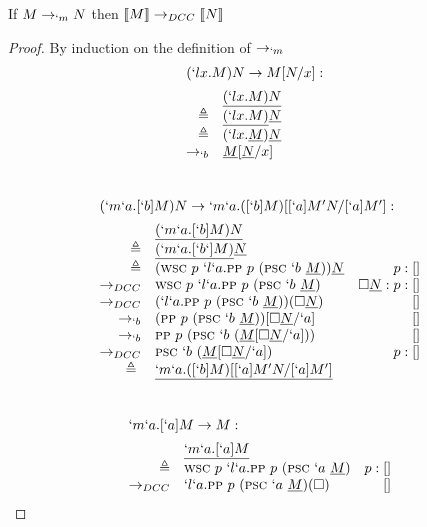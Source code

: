 \begin{theorem}
If $M \rightarrow_{`m} N$ then $\llbracket M \rrbracket \rightarrow_{DCC} \llbracket N \rrbracket$
\end{theorem}

\begin{proof}{By induction on the definition of $\rightarrow_{`m}$}
\[
\begin{array}{rlrl}
  \prooflabel{(`lx.M)N \to M[N/x]:} \\
               & \tr{(`lx.M)N} \\
    \triangleq & \tr{(`lx.M)} \tr{N} \\
    \triangleq & (`lx.\tr{M}) \tr{N} \\
    \tob\   & \tr{M}[\tr{N}/x] \\
\end{array} 
\]
\\
\[
\begin{array}{rlrl}
  \prooflabel{(`m`a.[`b]M)N \to `m`a.([`b]M)[[`a]M^\prime N/[`a]M^\prime]:} \\
             & \tr{(`m`a.[`b]M)N} \\
  \triangleq & \tr{(`m`a.[`b`]M)} \tr{N} \\
  \triangleq & (\wsc\ p\ `l`a. \pp\ p\ (\psc\ `b\ \tr{M})) \tr{N} & p:[] \\
  \todcc\ & \wsc\ p\ `l`a. \pp\ p\ (\psc\ `b\ \tr{M}) & \square \tr{N}:p:[] \\
  \todcc\ & (`l`a. \pp\ p\ (\psc\ `b\ \tr{M}))(\square\tr{N}) & [] \\
  \tob\ & (\pp\ p\ (\psc\ `b\ \tr{M}))[\square\tr{N}/`a] & [] \\
  \tob\ & \pp\ p\ (\psc\ `b\ (\tr{M}[\square\tr{N}/`a])) & [] \\
  \todcc\ & \psc\ `b\ (\tr{M}[\square\tr{N}/`a]) & p:[] \\
  \triangleq\ & \tr{`m`a.([`b]M)[[`a]M^\prime N/[`a]M^\prime]} \\
\end{array} 
\]
\\
\[
\begin{array}{rlrl}
  \prooflabel{`m`a.[`a]M \to M:} \\
              & \tr{`m`a.[`a]M} \\
   \triangleq & \wsc\ p\ `l`a.\pp\ p\ (\psc\ `a\ \tr{M}) & p:[] \\
   \todcc\    & `l`a.\pp\ p\ (\psc\ `a\ \tr{M})(\square) & [] \\

\end{array}\]
\end{proof}
